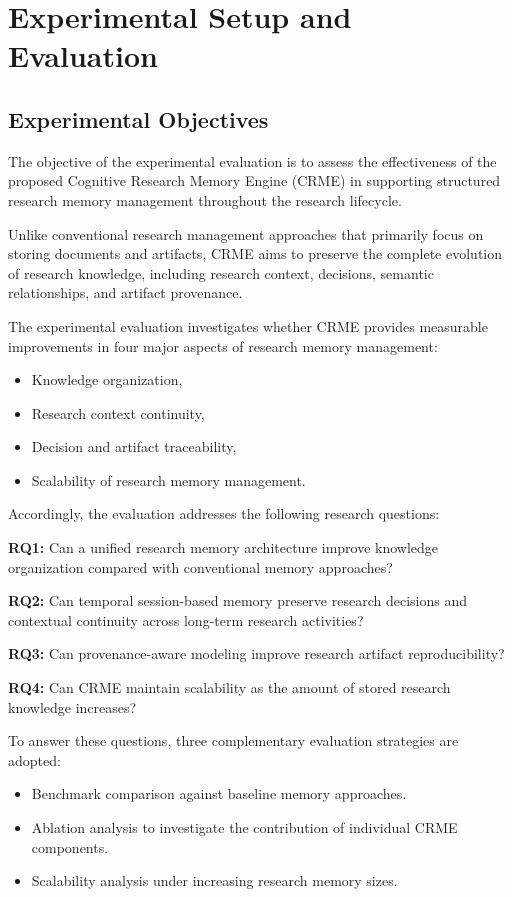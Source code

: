 \section{Experimental Setup and Evaluation}
\label{sec:evaluation}

\subsection{Experimental Objectives}

The objective of the experimental evaluation is to assess the effectiveness of the proposed Cognitive Research Memory Engine (CRME) in supporting structured research memory management throughout the research lifecycle.

Unlike conventional research management approaches that primarily focus on storing documents and artifacts, CRME aims to preserve the complete evolution of research knowledge, including research context, decisions, semantic relationships, and artifact provenance.

The experimental evaluation investigates whether CRME provides measurable improvements in four major aspects of research memory management:

\begin{itemize}
    \item Knowledge organization,
    \item Research context continuity,
    \item Decision and artifact traceability,
    \item Scalability of research memory management.
\end{itemize}

Accordingly, the evaluation addresses the following research questions:

\textbf{RQ1:}
Can a unified research memory architecture improve knowledge organization compared with conventional memory approaches?

\textbf{RQ2:}
Can temporal session-based memory preserve research decisions and contextual continuity across long-term research activities?

\textbf{RQ3:}
Can provenance-aware modeling improve research artifact reproducibility?

\textbf{RQ4:}
Can CRME maintain scalability as the amount of stored research knowledge increases?

To answer these questions, three complementary evaluation strategies are adopted:

\begin{itemize}
    \item Benchmark comparison against baseline memory approaches.
    \item Ablation analysis to investigate the contribution of individual CRME components.
    \item Scalability analysis under increasing research memory sizes.
\end{itemize}


